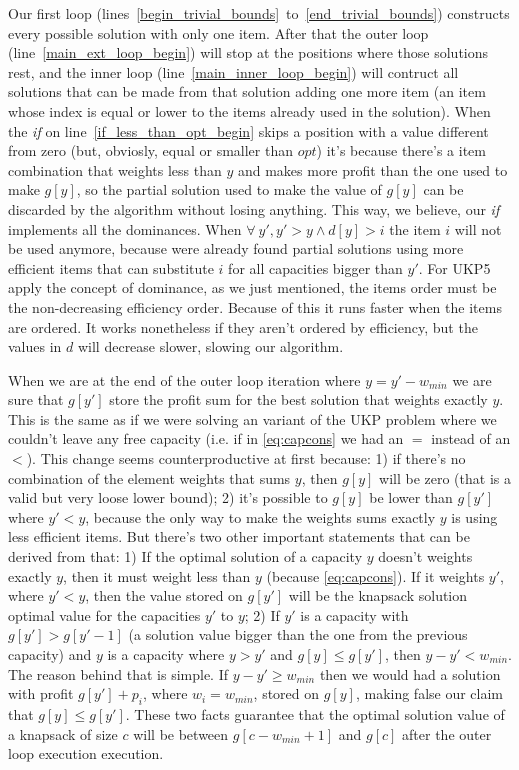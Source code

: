 \documentclass[12pt]{article}
\begin{document}
Our first loop (lines~\ref{begin_trivial_bounds}~to~\ref{end_trivial_bounds}) constructs every possible solution with only one item. After that the outer loop (line~\ref{main_ext_loop_begin}) will stop at the positions where those solutions rest, and the inner loop (line~\ref{main_inner_loop_begin}) will contruct all solutions that can be made from that solution adding one more item (an item whose index is equal or lower to the items already used in the solution). When the \textit{if} on line~\ref{if_less_than_opt_begin} skips a position with a value different from zero (but, obviosly, equal or smaller than \(opt\)) it's because there's a item combination that weights less than \(y\) and makes more profit than the one used to make \(g[y]\), so the partial solution used to make the value of \(g[y]\) can be discarded by the algorithm without losing anything. This way, we believe, our \textit{if} implements all the dominances. When \(\forall~y', y' > y \land d[y] > i\) the item \(i\) will not be used anymore, because were already found partial solutions using more efficient items that can substitute \(i\) for all capacities bigger than \(y'\). For UKP5 apply the concept of dominance, as we just mentioned, the items order must be the non-decreasing efficiency order. Because of this it runs faster when the items are ordered. It works nonetheless if they aren't ordered by efficiency, but the values in \(d\) will decrease slower, slowing our algorithm.

When we are at the end of the outer loop iteration where \(y = y' - w_{min}\) we are sure that \(g[y']\) store the profit sum for the best solution that weights exactly \(y\). This is the same as if we were solving an variant of the UKP problem where we couldn't leave any free capacity (i.e. if in \eqref{eq:capcons} we had an \(=\) instead of an \(<\)). This change seems counterproductive at first because: 1) if there's no combination of the element weights that sums \(y\), then \(g[y]\) will be zero (that is a valid but very loose lower bound); 2) it's possible to \(g[y]\) be lower than \(g[y']\) where \(y' < y\), because the only way to make the weights sums exactly \(y\) is using less efficient items. But there's two other important statements that can be derived from that: 1) If the optimal solution of a capacity \(y\) doesn't weights exactly \(y\), then it must weight less than \(y\) (because \eqref{eq:capcons}). If it weights \(y'\), where \(y' < y\), then the value stored on \(g[y']\) will be the knapsack solution optimal value for the capacities \(y'\) to \(y\); 2) If \(y'\) is a capacity with \(g[y'] > g[y'-1]\) (a solution value bigger than the one from the previous capacity) and \(y\) is a capacity where \(y > y'\) and \(g[y] \leq g[y']\), then \(y - y' < w_{min}\). The reason behind that is simple. If \(y - y' \geq w_{min}\) then we would had a solution with profit \(g[y'] + p_i\), where \(w_i = w_{min}\), stored on \(g[y]\), making false our claim that \(g[y] \leq g[y']\). These two facts guarantee that the optimal solution value of a knapsack of size \(c\) will be between \(g[c-w_{min}+1]\) and \(g[c]\) after the outer loop execution execution.
\end{document}
